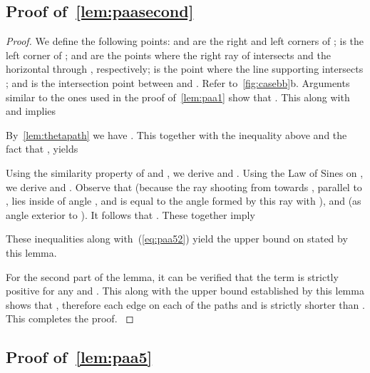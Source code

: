 \documentclass[runningheads,a4paper]{llncs}
\newcommand{\ABox}{
\raisebox{3pt}{\framebox[6pt]{\rule{6pt}{0pt}}}
}
\begin{document}
\subsection{Proof of~\autoref{lem:paasecond}}

\aasecondlemma*

\begin{proof}
We define the following points:  and  are the right and left corners of ;  is the left corner of ;  and  are the points where the right ray of  intersects  and the horizontal through , respectively;  is the point where the line supporting  intersects ; and  is the intersection point between  and . Refer to~\autoref{fig:casebb}b. Arguments similar to the ones used in the proof of~\autoref{lem:paa1} show that . This along with  and  implies 

By~\autoref{lem:thetapath} we have  
. This together with the inequality above and the fact that 
,  yields 

Using the similarity property of  and , we derive  and 
.
Using the Law of Sines on , we derive 
 and 
.
Observe that  (because the ray shooting from  towards , parallel to , lies inside  of angle , and  is equal to the angle formed by this ray with ), and  (as angle exterior to ). It follows that . These together imply

These inequalities along with~(\ref{eq:paa52}) yield
the upper bound on  stated by this lemma.



For the second part of the lemma, it can be verified that the term  is strictly positive for any  and . This along with the upper bound established by this lemma shows that , therefore each edge on each of the paths  and  is strictly shorter than . This completes the proof.
{\hfill\ABox}\end{proof}

\subsection{Proof of~\autoref{lem:paa5}}

\aathirdlemma*
\end{document}
